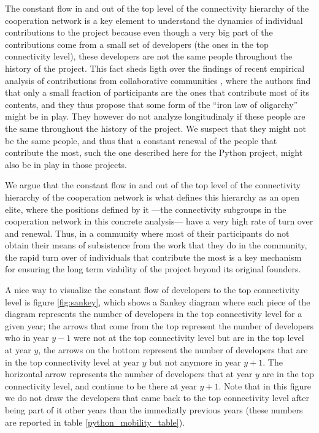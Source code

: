 The constant flow in and out of the top level of the connectivity hierarchy of the cooperation network is a key element to understand the dynamics of individual contributions to the project because even though a very big part of the contributions come from a small set of developers (the ones in the top connectivity level), these developers are not the same people throughout the history of the project. This fact sheds ligth over the findings of recent empirical analysis of contributions from collaborative communities \citep{shaw:2014}, where the authors find that only a small fraction of participants are the ones that contribute most of its contents, and they thus propose that some form of the ``iron law of oligarchy'' might be in play. They however do not analyze longitudinaly if these people are the same throughout the history of the project. We suspect that they might not be the same people, and thus that a constant renewal of the people that contribute the most, such the one described here for the Python project, might also be in play in those projects.  

We argue that the constant flow in and out of the top level of the connectivity hierarchy of the cooperation network is what defines this hierarchy as an open elite, where the positions defined by it ---the connectivity subgroups in the cooperation network in this concrete analysis--- have a very high rate of turn over and renewal. Thus, in a community where most of their participants do not obtain their means of subsistence from the work that they do in the community, the rapid turn over of individuals that contribute the most is a key mechanism for ensuring the long term viability of the project beyond its original founders.

A nice way to visualize the constant flow of developers to the top connectivity level is figure \ref{fig:sankey}, which shows a Sankey diagram where each piece of the diagram represents the number of developers in the top connectivity level for a given year; the arrows that come from the top represent the number of developers who in year $y - 1$ were not at the top connectivity level but are in the top level at year $y$, the arrows on the bottom represent the number of developers that are in the top connectivity level at year $y$ but not anymore in year $y + 1$. The horizontal arrow represents the number of developers that at year $y$ are in the top connectivity level, and continue to be there at year $y + 1$. Note that in this figure we do not draw the developers that came back to the top connectivity level after being part of it other years than the immediatly previous years (these numbers are reported in table \ref{python_mobility_table}).

